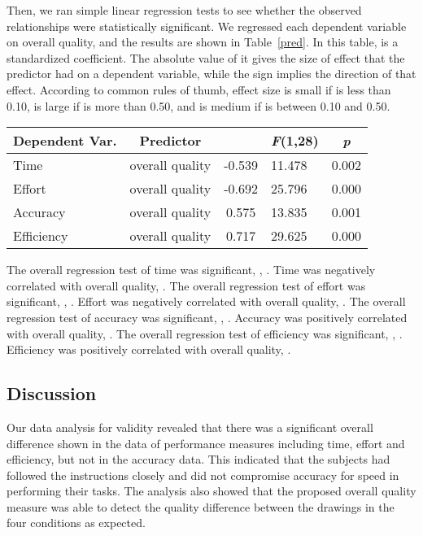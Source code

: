 \documentclass[conference,letterpaper]{IEEEtran}
\begin{document}
Then, we ran simple linear regression tests to see whether the observed relationships were statistically significant. We regressed each dependent variable on overall quality, and the results are shown in Table~\ref{pred}. In this table,  is a standardized coefficient. The absolute value of it gives the size of effect that the predictor had on a dependent variable, while the sign implies the direction of that effect. According to common rules of thumb, effect size is small if  is less than 0.10, is large if  is more than 0.50, and is medium if  is between 0.10 and 0.50.

\begin{table*}[!t]

\renewcommand{\arraystretch}{1.3}
\caption{Results of Simple Linear Regression Tests}
\label{pred}
\centering
\begin{tabular}{l|c|c|l|c}

\hline
Dependent Var. & Predictor  &  & \emph{F}(1,28) & \emph{p}\\
\hline
\hline
Time & overall quality & -0.539 & 11.478 & 0.002\\
Effort & overall quality & -0.692 & 25.796 & 0.000\\
Accuracy & overall quality & 0.575 & 13.835 & 0.001\\
Efficiency & overall quality & 0.717 & 29.625  & 0.000\\
\hline
\end{tabular}
\end{table*}

The overall regression test of time was significant, , . Time was negatively correlated with overall quality, . The overall regression test of effort was significant, , . Effort was negatively correlated with overall quality, . The overall regression test of accuracy was significant, , . Accuracy was positively correlated with overall quality, . The overall regression test of efficiency was significant, , . Efficiency was positively correlated with overall quality, .


\subsection{Discussion}


Our data analysis for validity revealed that there was a significant overall difference shown in the data of performance measures including time, effort and efficiency, but not in the accuracy data. This indicated that the subjects had followed the instructions closely and did not compromise accuracy for speed in performing their tasks. The analysis also showed that the proposed overall quality measure was able to detect the quality difference between the drawings in the four conditions as expected. 
\end{document}
